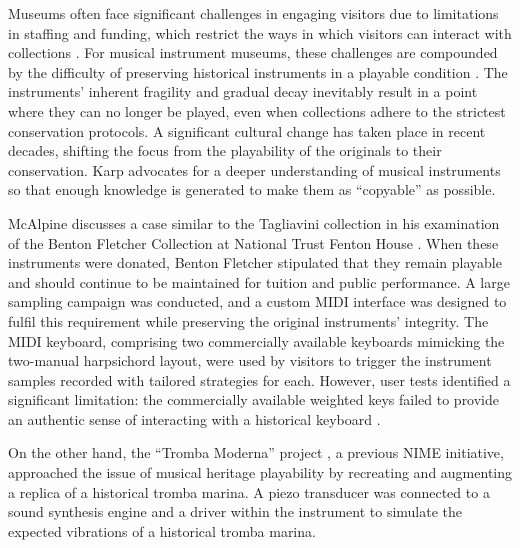 Museums often face significant challenges in engaging visitors due to limitations in staffing and funding, which restrict the ways in which visitors can interact with collections \cite{Templeton2018, McAlpine2014}. For musical instrument museums, these challenges are compounded by the difficulty of preserving historical instruments in a playable condition \cite{McAlpine2014}. The instruments' inherent fragility and gradual decay inevitably result in a point where they can no longer be played, even when collections adhere to the strictest conservation protocols. A significant cultural change has taken place in recent decades, shifting the focus from the playability of the originals to their conservation. Karp \cite{Karp1979,Karp1985} advocates for a deeper understanding of musical instruments so that enough knowledge is generated to make them as ``copyable'' as possible.

McAlpine discusses a case similar to the Tagliavini collection in his examination of the Benton Fletcher Collection at National Trust Fenton House \cite{McAlpine2014}. When these instruments were donated, Benton Fletcher stipulated that they remain playable and should continue to be maintained for tuition and public performance. A large sampling campaign was conducted, and a custom MIDI interface was designed to fulfil this requirement while preserving the original instruments' integrity. The MIDI keyboard, comprising two commercially available keyboards mimicking the two-manual harpsichord layout, were used by visitors to trigger the instrument samples recorded with tailored strategies for each. However, user tests identified a significant limitation: the commercially available weighted keys failed to provide an authentic sense of interacting with a historical keyboard \cite{McAlpine2014}. 


On the other hand, the ``Tromba Moderna'' project \cite{Baldwin2016}, a previous NIME initiative, approached the issue of musical heritage playability by recreating and augmenting a replica of a historical tromba marina. A piezo transducer was connected to a sound synthesis engine and a driver within the instrument to simulate the expected vibrations of a historical tromba marina. 

